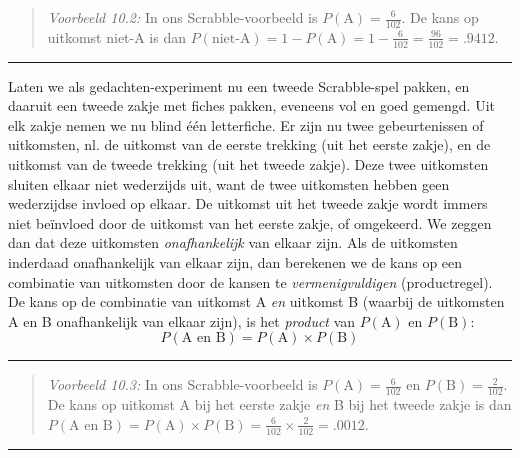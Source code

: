 \documentclass[
]{book}
\begin{document}
\begin{quote}
\emph{Voorbeeld 10.2:}
In ons Scrabble-voorbeeld is \(P(\textrm{A})=\frac{6}{102}\). De kans op
uitkomst niet-A is dan
\(P(\textrm{niet-A})= 1 - P(\textrm{A}) = 1 - \frac{6}{102} = \frac{96}{102} = .9412\).
\end{quote}

\begin{center}\rule{0.5\linewidth}{0.5pt}\end{center}

Laten we als gedachten-experiment nu een tweede Scrabble-spel pakken, en
daaruit een tweede zakje met fiches pakken, eveneens vol en goed
gemengd. Uit elk zakje nemen we nu blind één letterfiche. Er zijn nu
twee gebeurtenissen of uitkomsten, nl. de uitkomst van de eerste
trekking (uit het eerste zakje), en de uitkomst van de tweede trekking
(uit het tweede zakje). Deze twee uitkomsten sluiten elkaar niet
wederzijds uit, want de twee uitkomsten hebben geen wederzijdse invloed
op elkaar. De uitkomst uit het tweede zakje wordt immers niet beïnvloed
door de uitkomst van het eerste zakje, of omgekeerd. We zeggen dan dat
deze uitkomsten \emph{onafhankelijk} van elkaar zijn. Als de uitkomsten
inderdaad onafhankelijk van elkaar zijn, dan berekenen we de kans op een
combinatie van uitkomsten door de kansen te \emph{vermenigvuldigen}
(productregel). De kans op de combinatie van uitkomst A \emph{en} uitkomst B
(waarbij de uitkomsten A en B onafhankelijk van elkaar zijn), is het
\emph{product} van \(P(\textrm{A})\) en \(P(\textrm{B})\):
\begin{equation}
    P(\textrm{A en B}) = P(\textrm{A}) \times P(\textrm{B})
  \label{eq:kans-productregel}
\end{equation}

\begin{center}\rule{0.5\linewidth}{0.5pt}\end{center}

\begin{quote}
\emph{Voorbeeld 10.3:}
In ons Scrabble-voorbeeld is \(P(\textrm{A})=\frac{6}{102}\) en
\(P(\textrm{B})=\frac{2}{102}\). De kans op uitkomst A bij het eerste
zakje \emph{en} B bij het tweede zakje is dan
\(P(\textrm{A en B})=P(\textrm{A}) \times P(\textrm{B})=\frac{6}{102} \times \frac{2}{102} = .0012\).
\end{quote}

\begin{center}\rule{0.5\linewidth}{0.5pt}\end{center}
\end{document}
